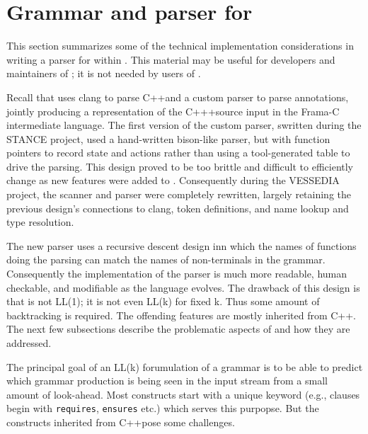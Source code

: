 \newcommand{\lang}{C++}
\chapter{Grammar and parser for \acslpp}
\label{sec:grammar}

This section summarizes some of the technical implementation considerations in writing a parser for \acslpp within \fclang. This material may be useful for developers and maintainers of \fclang; it is not needed by users of \fclang.

Recall that \fclang uses clang to parse \lang and a custom parser to parse \acslpp annotations, jointly producing a representation of the \lang+\acslpp source input in the Frama-C intermediate language. The first version of the \acslpp custom parser, swritten during the STANCE project, used a hand-written bison-like parser, but with function pointers to record state and actions rather than using a tool-generated table to drive the parsing. This design proved to be too brittle and difficult to efficiently change as new features were added to \acslpp. Consequently during the VESSEDIA project, the scanner and parser were completely rewritten, largely retaining the previous design's connections to clang, token definitions, and name lookup and type resolution.

The new parser uses a recursive descent design inn which the names of functions doing the parsing can match the names of non-terminals in the grammar. Consequently the implementation of the parser is much more readable, human checkable, and modifiable as the \acslpp language evolves. The drawback of this design is that \acslpp is not LL(1); it is not even LL(k) for fixed k. Thus some amount of backtracking is required. The offending features are mostly inherited from \lang. The next few subsections describe the problematic aspects of \acslpp and how they are addressed.

The principal goal of an LL(k) forumulation of a grammar is to be able to predict which grammar production is being seen in the input stream from a small amount of look-ahead.
Most \acslpp constructs start with a unique keyword (e.g., clauses begin with \lstinline|requires|, \lstinline|ensures| etc.) which serves this purpopse. But the constructs inherited from \lang pose some challenges.

